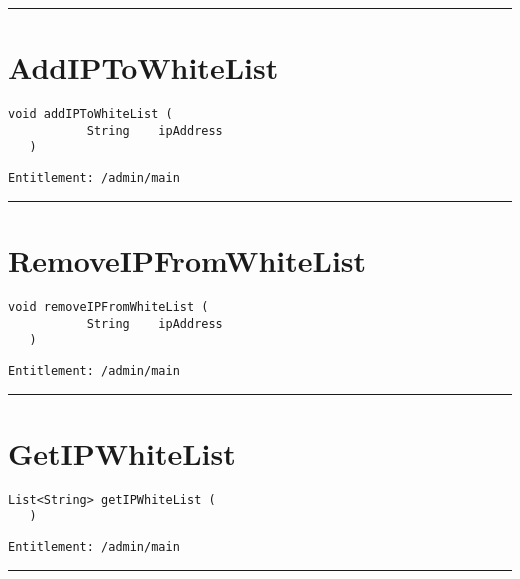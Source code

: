 \rule{12cm}{2pt}
\section{AddIPToWhiteList}
\label{Api:AddIPToWhiteList}
\begin{lstlisting}[style=nonumbers]
   void addIPToWhiteList (
           String    ipAddress
   )
\end{lstlisting}
\begin{Verbatim}[formatcom=\color{Maroon}]
  Entitlement: /admin/main
\end{Verbatim}



\rule{12cm}{2pt}
\section{RemoveIPFromWhiteList}
\label{Api:RemoveIPFromWhiteList}
\begin{lstlisting}[style=nonumbers]
   void removeIPFromWhiteList (
           String    ipAddress
   )
\end{lstlisting}
\begin{Verbatim}[formatcom=\color{Maroon}]
  Entitlement: /admin/main
\end{Verbatim}



\rule{12cm}{2pt}
\section{GetIPWhiteList}
\label{Api:GetIPWhiteList}
\begin{lstlisting}[style=nonumbers]
   List<String> getIPWhiteList (
   )
\end{lstlisting}
\begin{Verbatim}[formatcom=\color{Maroon}]
  Entitlement: /admin/main
\end{Verbatim}



\rule{12cm}{2pt}
